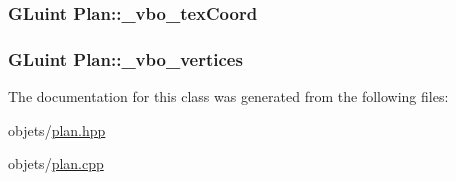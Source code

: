 \hypertarget{class_plan_a3c16becd29f35260b79af8b9cb6fa892}{
\subsubsection[{\+\_\+vbo\+\_\+tex\+Coord}]{\setlength{\rightskip}{0pt plus 5cm}G\+Luint Plan\+::\+\_\+vbo\+\_\+tex\+Coord\hspace{0.3cm}{\ttfamily [private]}}}\label{class_plan_a3c16becd29f35260b79af8b9cb6fa892}
\hypertarget{class_plan_a7b203dc36964da663836cf7614fe711a}{
\subsubsection[{\+\_\+vbo\+\_\+vertices}]{\setlength{\rightskip}{0pt plus 5cm}G\+Luint Plan\+::\+\_\+vbo\+\_\+vertices\hspace{0.3cm}{\ttfamily [private]}}}\label{class_plan_a7b203dc36964da663836cf7614fe711a}


The documentation for this class was generated from the following files\+:\begin{DoxyCompactItemize}
\item 
objets/\hyperlink{plan_8hpp}{plan.\+hpp}\item 
objets/\hyperlink{plan_8cpp}{plan.\+cpp}\end{DoxyCompactItemize}
